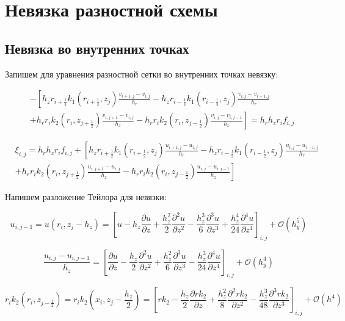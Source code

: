\section{Невязка разностной схемы}

\subsection{Невязка во внутренних точках}

Запишем для уравнения разностной сетки во внутренних точках невязку:

\begin{align*}
  &- \left [ 
  h_z r_{i+\frac{1}{2}} k_1(r_{i+\frac{1}{2}}, z_j) \frac{v_{i+1, j} - v_{i, j}}{h_{r}}
  - h_z r_{i-\frac{1}{2}} k_1(r_{i-\frac{1}{2}}, z_j) \frac{v_{i, j} - v_{i - 1, j}}{h_{r}}
  \right . \\
  &\left .
  + h_r r_{i} k_2(r_i, z_{j+\frac{1}{2}}) \frac{v_{i, j + 1} - v_{i, j}}{h_{z}}
  - h_r r_{i} k_2(r_i, z_{j-\frac{1}{2}}) \frac{v_{i, j} - v_{i, j - 1}}{h_z}
  \right ]  = h_r h_z r_i f_{i, j}
\end{align*}

\begin{align*}
  &\xi_{i, j} = h_r h_z r_i f_{i, j} + 
  \left [ 
  h_z r_{i+\frac{1}{2}} k_1(r_{i+\frac{1}{2}}, z_j) \frac{u_{i+1, j} - u_{i, j}}{h_{r}}
  - h_z r_{i-\frac{1}{2}} k_1(r_{i-\frac{1}{2}}, z_j) \frac{u_{i, j} - u_{i - 1, j}}{h_{r}}
  \right . \\
  &\left .
  + h_r r_{i} k_2(r_i, z_{j+\frac{1}{2}}) \frac{u_{i, j + 1} - u_{i, j}}{h_{z}}
  - h_r r_{i} k_2(r_i, z_{j-\frac{1}{2}}) \frac{u_{i, j} - u_{i, j - 1}}{h_z}
  \right ]
\end{align*}

Напишем разложение Тейлора для невязки:

\[
u_{i, j - 1} = u(r_i, z_j - h_z) = \left[
  u - h_z \frac{\partial u}{\partial z} + \frac{h_z^2}{2}\frac{\partial^2 u}{\partial z^2}
  - \frac{h_z^3}{6}\frac{\partial^3 u}{\partial z^3} + \frac{h_z^4}{24}\frac{\partial^4 u}{\partial z^4}
\right]_{i, j} + \mathcal{O}(h^5_y)
\]

\[
  \frac{u_{i, j} - u_{i, j - 1}}{h_z} = \left[
    \frac{\partial u}{\partial z} - \frac{h_z}{2}\frac{\partial^2 u}{\partial z^2}
    + \frac{h_z^2}{6}\frac{\partial^3 u}{\partial z^3} - \frac{h_z^3}{24}\frac{\partial^4 u}{\partial z^4}
  \right]_{i,j} + \mathcal{O}(h^4_y)
\]

\[
  r_{i} k_2(r_i, z_{j-\frac{1}{2}}) = r_i k_2(x_i, z_j - \frac{h_z}{2}) =
  \left[
   r k_2 - \frac{h_z}{2} \frac{\partial r k_2}{\partial z}
   + \frac{h_z^2}{8} \frac{\partial^2 r k_2}{\partial z^2}
   - \frac{h_z^3}{48} \frac{\partial^3 r k_2}{\partial z^3}
  \right]_{i, j} + \mathcal{O}(h^4)
\]

